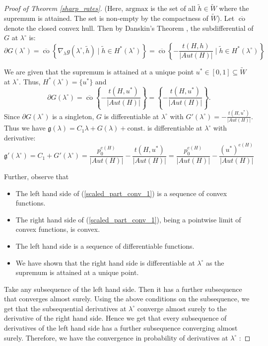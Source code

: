 \documentclass[12pt]{article}
\DeclareMathOperator{\co}{co}    %
\newcommand{\subdiff}{\partial} %
\numberwithin{equation}{section}
\begin{document}
\begin{proof}[Proof of Theorem \ref{sharp_rates}]
(Here, \(\mathrm{arg max}\) is the set of all \(\tilde{h}\in \tilde{W}\) where the supremum is attained. The set is non-empty by the compactness of \(\tilde{W}\)). Let \(\overline{\co}\) denote the closed convex hull. Then by Danskin's Theorem \cite{danskin1966theory}, the subdifferential of $G$ at $\lambda^{\circ}$ is:
    $$ \subdiff G(\lambda^{\circ}) = \overline{\co} \left\{ \nabla_\lambda g(\lambda^{\circ}, \tilde{h}) \mid \tilde{h} \in H^*(\lambda^{\circ}) \right\} = \overline{\co} \left\{ -\frac{t(H,h)}{\lvert Aut(H)\rvert} \mid \tilde{h} \in H^*(\lambda^{\circ}) \right\} $$
        
We are given that the supremum is attained at a unique point $u^* \in [0,1]\subseteq \tilde{W}$ at $\lambda^{\circ}$. Thus, $H^*(\lambda^{\circ}) = \{u^*\}$ and 
    $$ \subdiff G(\lambda^{\circ}) = \overline{\co} \left\{ -\frac{t(H,u^*)}{\lvert Aut(H)\rvert} \right\} = \left\{ -\frac{t(H,u^*)}{\lvert Aut(H)\rvert} \right\}.$$
Since $\subdiff G(\lambda^{\circ})$ is a singleton, $G$ is differentiable at $\lambda^{\circ}$ with $G'(\lambda^{\circ}) = -\frac{t(H,u^*)}{\lvert Aut(H)\rvert}$. Thus we have  $\mathfrak{g}(\lambda) = C_1 \lambda + G(\lambda) + \text{const}$. is differentiable at $\lambda^{\circ}$ with derivative:
    $$ \mathfrak{g}'(\lambda^{\circ}) = C_1 + G'(\lambda^{\circ}) = \frac{p_0^{e(H)}}{\lvert Aut(H)\rvert} - \frac{t(H,u^*)}{\lvert Aut(H)\rvert} = \frac{p_0^{e(H)}}{\lvert Aut(H)\rvert} - \frac{(u^*)^{e(H)}}{\lvert Aut(H)\rvert}$$
  

Further, observe that

\begin{itemize}
\item The left hand side of (\ref{scaled_part_conv_1}) is a sequence of convex functions.
\item The right hand side of (\ref{scaled_part_conv_1}), being a pointwise limit of convex functions, is convex.
\item The left hand side is a sequence of differentiable functions.
\item We have shown that the right hand side is differentiable at $\lambda^{\circ}$ as the supremum is attained at a unique point.
\end{itemize}

Take any subsequence of the left hand side. Then it has a further subsequence that converges almost surely. Using the above conditions on the subsequence, we get that the subsequential derivatives at $\lambda^{\circ}$ converge almost surely to the derivative of the right hand side. Hence we get that every subsequence of derivatives of the left hand side has a further subsequence converging almost surely. Therefore, we have the convergence in probability of derivatives at $\lambda^{\circ}$ :


\end{proof}
\end{document}
